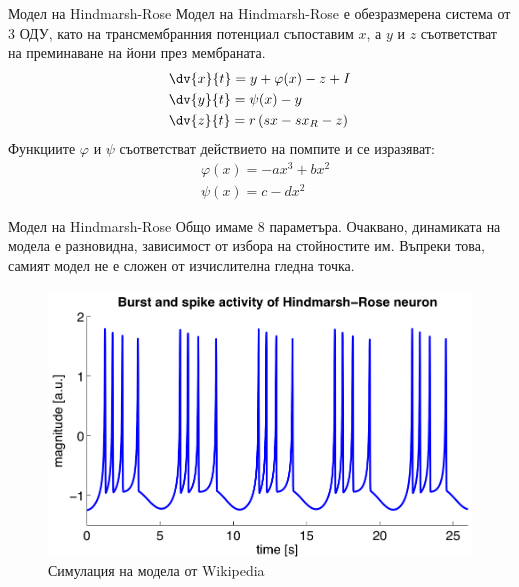 \begin{frame}[t]{Модел на Hindmarsh-Rose}
    Модел на Hindmarsh-Rose е обезразмерена система от 3 ОДУ, 
    като на трансмембранния потенциал съпоставим $x$,
    а $y$ и $z$ съответстват на преминаване на йони през мембраната.
    \begin{align*}
        &\dv{x}{t}=y + \varphi(x) - z + I\\
        &\dv{y}{t}=\psi(x) - y\\
        &\dv{z}{t}=r\left(sx - sx_R - z\right)
    \end{align*}
    Функциите $\varphi$ и $\psi$ съответстват действието на помпите и се изразяват:
    \begin{align*}
        &\varphi(x) = -ax^3 + bx^2\\
        &\psi(x) = c - dx^2
    \end{align*}
\end{frame}

\begin{frame}[t]{Модел на Hindmarsh-Rose}
    Общо имаме 8 параметъра. Очаквано, динамиката на модела е разновидна, зависимост от избора на стойностите им.
    Въпреки това, самият модел не е сложен от изчислителна гледна точка.
    \begin{figure}[htbp!]
        \centering
        \includegraphics[width=\textwidth,height=0.7\textheight,keepaspectratio]{hindmarsch-rose-graph.png}
        \caption{Симулация на модела от Wikipedia}
    \end{figure}  
\end{frame}